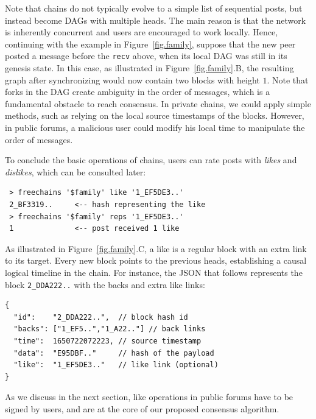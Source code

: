 \documentclass[10pt,journal,compsoc]{IEEEtran}
\newcommand{\code}[1]  {\texttt{\footnotesize{#1}}}
\begin{document}
Note that chains do not typically evolve to a simple list of sequential posts,
but instead become DAGs with multiple heads.
The main reason is that the network is inherently concurrent and users are
encouraged to work locally.
Hence, continuing with the example in Figure~\ref{fig.family}, suppose that the
new peer posted a message before the \code{recv} above, when its local DAG was
still in its genesis state.
In this case, as illustrated in Figure~\ref{fig.family}.B, the resulting graph
after synchronizing would now contain two blocks with height $1$.
%
Note that forks in the DAG create ambiguity in the order of messages, which is
a fundamental obstacle to reach consensus.
In private chains, we could apply simple methods, such as relying on the local
source timestamps of the blocks.
However, in public forums, a malicious user could modify his local time to
manipulate the order of messages.

To conclude the basic operations of chains, users can rate posts with
\emph{likes} and \emph{dislikes}, which can be consulted later:

{\footnotesize
\begin{verbatim}
 > freechains '$family' like '1_EF5DE3..'
 2_BF3319..     <-- hash representing the like
 > freechains '$family' reps '1_EF5DE3..'
 1              <-- post received 1 like
\end{verbatim}
}

As illustrated in Figure~\ref{fig.family}.C, a like is a regular block with an
extra link to its target.
Every new block points to the previous heads, establishing a causal logical
timeline in the chain.
For instance, the JSON that follows represents the block \code{2\_DDA222..}
with the backs and extra like links:

{\footnotesize
\begin{verbatim}
{
  "id":    "2_DDA222..",  // block hash id
  "backs": ["1_EF5..","1_A22.."] // back links
  "time":  1650722072223, // source timestamp
  "data":  "E95DBF.."     // hash of the payload
  "like":  "1_EF5DE3.."   // like link (optional)
}
\end{verbatim}
}

As we discuss in the next section, like operations in public forums have to be
signed by users, and are at the core of our proposed consensus algorithm.
\end{document}
